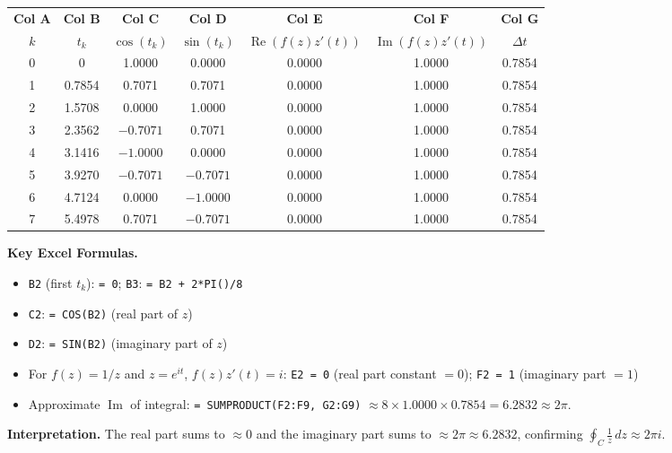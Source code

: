 \documentclass[12pt,a4paper]{article}
\begin{document}
\begin{center}
\renewcommand{\arraystretch}{1.25}
\begin{tabular}{@{}ccccccc@{}}
\toprule
\textbf{Col A} & \textbf{Col B} & \textbf{Col C} & \textbf{Col D}
& \textbf{Col E} & \textbf{Col F} & \textbf{Col G} \\
$k$ & $t_k$ & $\cos(t_k)$ & $\sin(t_k)$ & $\operatorname{Re}(f(z)z'(t))$
& $\operatorname{Im}(f(z)z'(t))$ & $\Delta t$ \\
\midrule
0 & 0 & 1.0000 & 0.0000 & 0.0000 & 1.0000 & 0.7854 \\
1 & 0.7854 & 0.7071 & 0.7071 & 0.0000 & 1.0000 & 0.7854 \\
2 & 1.5708 & 0.0000 & 1.0000 & 0.0000 & 1.0000 & 0.7854 \\
3 & 2.3562 & $-0.7071$ & 0.7071 & 0.0000 & 1.0000 & 0.7854 \\
4 & 3.1416 & $-1.0000$ & 0.0000 & 0.0000 & 1.0000 & 0.7854 \\
5 & 3.9270 & $-0.7071$ & $-0.7071$ & 0.0000 & 1.0000 & 0.7854 \\
6 & 4.7124 & 0.0000 & $-1.0000$ & 0.0000 & 1.0000 & 0.7854 \\
7 & 5.4978 & 0.7071 & $-0.7071$ & 0.0000 & 1.0000 & 0.7854 \\
\bottomrule
\end{tabular}
\end{center}

\textbf{Key Excel Formulas.}
\begin{itemize}[leftmargin=1.5em]
  \item \texttt{B2} (first $t_k$): \texttt{= 0}; \texttt{B3}: \texttt{= B2 + 2*PI()/8}
  \item \texttt{C2}: \texttt{= COS(B2)} \quad (real part of $z$)
  \item \texttt{D2}: \texttt{= SIN(B2)} \quad (imaginary part of $z$)
  \item For $f(z)=1/z$ and $z=e^{it}$, $f(z)z'(t)=i$:
        \texttt{E2 = 0} (real part constant $= 0$); \texttt{F2 = 1} (imaginary part $= 1$)
  \item Approximate $\operatorname{Im}$ of integral: \texttt{= SUMPRODUCT(F2:F9, G2:G9)}
        $\approx 8 \times 1.0000 \times 0.7854 = 6.2832 \approx 2\pi$.
\end{itemize}

\textbf{Interpretation.} The real part sums to $\approx 0$ and the imaginary
part sums to $\approx 2\pi \approx 6.2832$, confirming
$\oint_C \frac{1}{z}\,dz \approx 2\pi i$.
\end{document}
